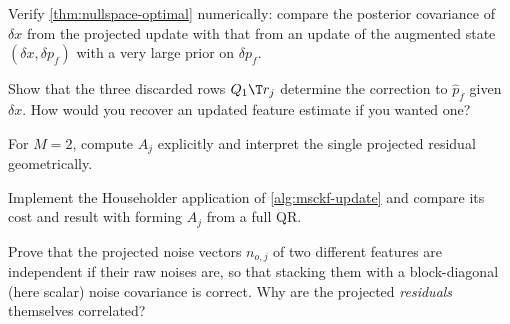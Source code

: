 \begin{exercises}
  \item Verify \cref{thm:nullspace-optimal} numerically: compare the posterior covariance of $\delta x$ from the projected update with
        that from an update of the augmented state $(\delta x, \delta p_f)$ with a very large prior on $\delta p_f$.
  \item Show that the three discarded rows $Q_1\T r_j$ determine the correction to $\hat p_f$ given $\delta x$. How would you recover an
        updated feature estimate if you wanted one?
  \item For $M = 2$, compute $A_j$ explicitly and interpret the single projected residual geometrically.
  \item Implement the Householder application of \cref{alg:msckf-update} and compare its cost and result with forming $A_j$ from a full QR.
  \item Prove that the projected noise vectors $n_{o,j}$ of two different features are independent if their raw noises are,
        so that stacking them with a block-diagonal (here scalar) noise covariance is correct. Why are the projected
        \emph{residuals} themselves correlated?
\end{exercises}
